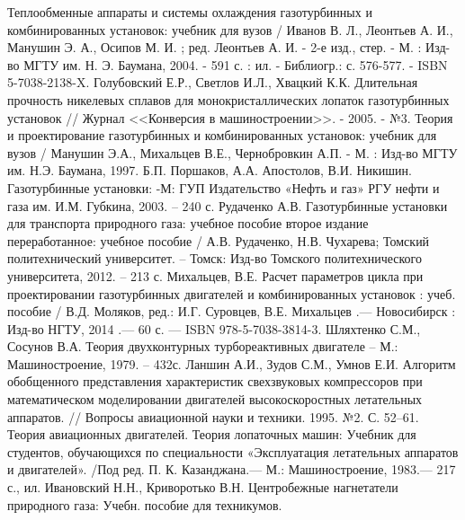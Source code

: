 \begin{thebibliography}{99}
     Теплообменные аппараты и системы охлаждения газотурбинных и комбинированных установок: учебник для
    вузов / Иванов В. Л., Леонтьев А. И., Манушин Э. А., Осипов М. И. ; ред. Леонтьев А. И. - 2-е изд.,
    стер. - М. : Изд-во МГТУ им. Н. Э. Баумана, 2004. - 591 с. : ил. - Библиогр.: с. 576-577. - ISBN 5-7038-2138-X.
     Голубовский Е.Р., Светлов И.Л., Хвацкий К.К. Длительная прочность никелевых сплавов для
    монокристаллических лопаток газотурбинных установок // Журнал <<Конверсия в машиностроении>>. - 2005. - №3.
     Теория и проектирование газотурбинных и комбинированных установок: учебник для вузов
    / Манушин Э.А., Михальцев В.Е., Чернобровкин А.П. - М. : Изд-во МГТУ им. Н.Э. Баумана, 1997.
     Б.П. Поршаков, А.А. Апостолов, В.И. Никишин. Газотурбинные установки: -М: ГУП Издательство
    «Нефть и газ» РГУ нефти и газа им. И.М. Губкина, 2003. – 240 с.
     Рудаченко А.В. Газотурбинные установки для транспорта природного газа: учебное пособие второе издание
    переработанное: учебное пособие / А.В. Рудаченко, Н.В. Чухарева; Томский политехнический университет. – Томск:
    Изд-во Томского политехнического университета, 2012. – 213 с.
     Михальцев, В.Е. Расчет параметров цикла при проектировании газотурбинных двигателей и комбинированных установок : учеб. пособие / В.Д. Моляков, ред.: И.Г. Суровцев, В.Е. Михальцев .— Новосибирск : Изд-во НГТУ, 2014 .— 60 с. — ISBN 978-5-7038-3814-3.
     Шляхтенко С.М., Сосунов В.А. Теория двухконтурных турбореактивных двигателе – М.: Машиностроение, 1979. – 432с.
     Ланшин А.И., Зудов С.М., Умнов Е.И. Алгоритм обобщенного представления характеристик свехзвуковых
    компрессоров при математическом моделировании двигателей высокоскоростных летательных аппаратов. // Вопросы авиационной науки и техники. 1995. №2. С. 52–61.
     Теория авиационных двигателей. Теория лопаточных машин: Учебник для студентов, обучающихся по специ­альности
    «Эксплуатация летательных аппаратов и двигателей». /Под ред. П. К. Казанджана.— М.: Машиностро­ение, 1983.— 217 с., ил.
     Ивановский Н.Н., Криворотько В.Н. Центробежные нагнетатели природного газа: Учебн. пособие для техникумов.

\end{thebibliography}
